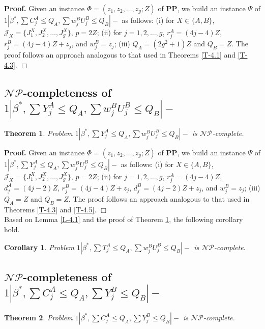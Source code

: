 \documentclass[12pt]{article}
\newtheorem{theorem}{Theorem}[section]
\newtheorem{cor}{Corollary}[section]
\begin{document}
\begin{sloppypar}
\noindent \textbf{Proof.} Given an instance $\Phi=(z_1, z_2, \ldots, z_g; Z)$ of $\mathbf{PP}$, we build an instance $\Psi$ of $1 | \beta^{*}, \sum C_j^A \leq Q_A, \sum w_j^B U_j^B \leq Q_B|-$ as follows: (i) for $X \in \{A, B\}$, $\mathcal{J}_X=\{J_1^X, J_2^X, \ldots, J_{g}^X\}$, $p=2Z$; (ii)  for $j=1, 2, \ldots, g$, $r_j^A=(4j-4) Z$, $r_j^B=(4j-4) Z+z_j$, and $w_j^B=z_j$; (iii) $Q_A=(2g^2+1)Z$ and $Q_B=Z$. The proof follows an approach analogous to that used in Theorems \ref{T-4.1} and \ref{T-4.3}. \hfill$\Box$

\subsection{$\mathcal{NP}$-completeness of $1 | \beta^{*}, \sum Y_j^A \leq Q_A, \sum w_j^B U_j^B \leq Q_B|-$}

\begin{theorem} \label{T-4.4}
Problem $1 | \beta^{*}, \sum Y_j^A \leq Q_A, \sum w_j^B U_j^B \leq Q_B|-$ is $\mathcal{NP}$-complete.
\end{theorem}

\noindent \textbf{Proof.} Given an instance $\Phi=(z_1, z_2, \ldots, z_g; Z)$ of $\mathbf{PP}$, we build an instance $\Psi$ of $1 | \beta^{*}, \sum Y_j^A \leq Q_A, \sum w_j^B U_j^B \leq Q_B|-$ as follows: (i) for $X \in \{A, B\}$, $\mathcal{J}_X=\{J_1^X, J_2^X, \ldots, J_{g}^X\}$, $p=2Z$; (ii) for $j=1, 2, \ldots, g$, $r_j^A=(4j-4) Z$, $d_j^A=(4j-2)Z$, $r_j^B=(4j-4) Z+z_j$, $d_j^B=(4j-2) Z+z_j$, and $w_j^B=z_j$; (iii) $Q_A=Z$ and $Q_B=Z$. The proof follows an approach analogous to that used in Theorems \ref{T-4.3} and \ref{T-4.5}. \hfill$\Box$\\

Based on Lemma \ref{L-4.1} and the proof of Theorem \ref{T-4.4}, the following corollary hold.

\begin{cor} \label{C-4.4.1}
Problem $1 | \beta^{*}, \sum T_j^A \leq Q_A, \sum w_j^B U_j^B \leq Q_B|-$ is $\mathcal{NP}$-complete.
\end{cor}

\subsection{$\mathcal{NP}$-completeness of $1 | \beta^{*}, \sum C_j^A \leq Q_A, \sum Y_j^B \leq Q_B|-$}

\begin{theorem} \label{T-4.6}
Problem $1 | \beta^{*}, \sum C_j^A \leq Q_A, \sum Y_j^B \leq Q_B|-$ is $\mathcal{NP}$-complete.
\end{theorem}


\end{sloppypar}
\end{document}
